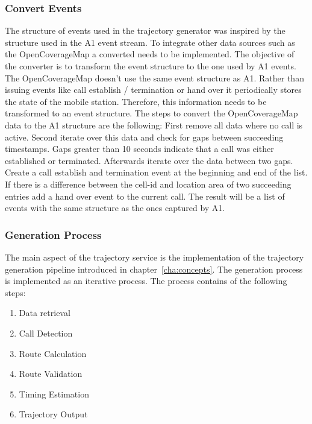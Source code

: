 \documentclass[master,english]{hgbthesis}
\begin{document}
\subsubsection{Convert Events}
The structure of events used in the trajectory generator was inspired by the structure used in the A1 event stream. To integrate other data sources such as the OpenCoverageMap a converted needs to be implemented. The objective of the converter is to transform the event structure to the one used by A1 events.
The OpenCoverageMap doesn't use the same event structure as A1. Rather than issuing events like call establish / termination or hand over it periodically stores the state of the mobile station. Therefore, this information needs to be transformed to an event structure. The steps to convert the OpenCoverageMap data to the A1 structure are the following: First remove all data where no call is active. Second iterate over this data and check for gaps between succeeding timestamps. Gaps greater than 10 seconds indicate that a call was either established or terminated. Afterwards iterate over the data between two gaps. Create a call establish and termination event at the beginning and end of the list. If there is a difference between the cell-id and location area of two succeeding entries add a hand over event to the current call. The result will be a  list of events with the same structure as the ones captured by A1.
\subsubsection{Generation Process}
The main aspect of the trajectory service is the implementation of the trajectory generation pipeline introduced in chapter~\ref{cha:concepts}. The generation process is implemented as an iterative process. The process contains of the following steps:
\begin{enumerate}
\item Data retrieval
\item Call Detection
\item Route Calculation
\item Route Validation
\item Timing Estimation
\item Trajectory Output
\end{enumerate}
\end{document}
